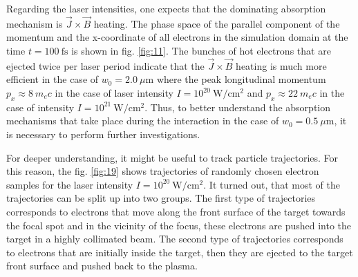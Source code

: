 Regarding the laser intensities, one expects that the dominating absorption mechanism is $ \vec{J} \times \vec{B} $ heating. The phase space of the parallel component of the momentum and the x-coordinate of all electrons in the simulation domain at the time $ t = 100 \ \mathrm{fs} $ is shown in fig. \ref{fig:11}. The bunches of hot electrons that are ejected twice per laser period indicate that the $ \vec{J} \times \vec{B} $ heating is much more efficient in the case of $ w_0 = 2.0 \ \mu\mathrm{m} $ where the peak longitudinal momentum $ p_x \approx 8 \ m_{e} c $ in the case of laser intensity $ I = 10^{20} \ \mathrm{W/cm^2} $ and $ p_x \approx 22 \ m_{e} c $ in the case of intensity $ I = 10^{21} \ \mathrm{W/cm^2} $. Thus, to better understand the absorption mechanisms that take place during the interaction in the case of $ w_0 = 0.5 \ \mu\mathrm{m} $, it is necessary to perform further investigations.

For deeper understanding, it might be useful to track particle trajectories. For this reason, the fig. \ref{fig:19} shows trajectories of randomly chosen electron samples for the laser intensity $ I = 10^{20} \ \mathrm{W/cm^2} $. It turned out, that most of the trajectories can be split up into two groups. The first type of trajectories corresponds to electrons that move along the front surface of the target towards the focal spot and in the vicinity of the focus, these electrons are pushed into the target in a highly collimated beam. The second type of trajectories corresponds to electrons that are initially inside the target, then they are ejected to the target front surface and pushed back to the plasma. 

